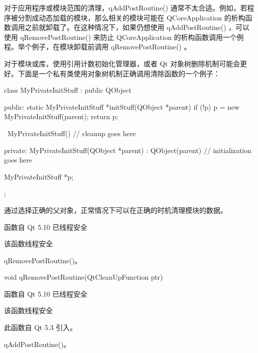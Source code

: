 \begin{notice}
对于应用程序或模块范围的清理，qAddPostRoutine() 通常不太合适。例如，若程序被分割成动态加载的模块，那么相关的模块可能在 QCoreApplication 的析构函数调用之前就卸载了。在这种情况下，如果仍想使用 qAddPostRoutine() ，可以使用 qRemovePostRoutine() 来防止 QCoreApplication 的析构函数调用一个例程。举个例子，在模块卸载前调用 qRemovePostRoutine() 。
\end{notice}

对于模块或库，使用引用计数初始化管理器，或者 Qt 对象树删除机制可能会更
好。下面是一个私有类使用对象树机制正确调用清除函数的一个例子：

\begin{cppcode}
class MyPrivateInitStuff : public QObject
{
public:
    static MyPrivateInitStuff *initStuff(QObject *parent)
    {
        if (!p)
            p = new MyPrivateInitStuff(parent);
        return p;
    }

    ~MyPrivateInitStuff()
    {
        // cleanup goes here
    }

private:
    MyPrivateInitStuff(QObject *parent)
        : QObject(parent)
    {
        // initialization goes here
    }

    MyPrivateInitStuff *p;
};
\end{cppcode}

通过选择正确的父对象，正常情况下可以在正确的时机清理模块的数据。

\begin{notice}
 函数自 Qt 5.10 已线程安全
\end{notice}

\begin{notice}
该函数线程安全
\end{notice}

\begin{seeAlso}
qRemovePostRoutine()。
\end{seeAlso}


void qRemovePostRoutine(QtCleanUpFunction ptr)

\begin{notice}
函数自 Qt 5.10 已线程安全
\end{notice}

 

\begin{notice}
该函数线程安全
\end{notice}


此函数自 Qt 5.3 引入。



\begin{seeAlso}
qAddPostRoutine()。
\end{seeAlso}


